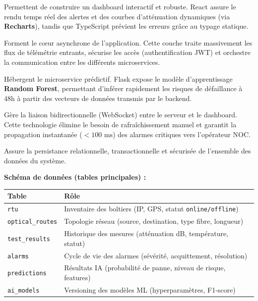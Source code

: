 \documentclass[11pt,a4paper]{article}
\begin{document}
\begin{description}[leftmargin=2.2cm, style=nextline]
    \item[\textcolor{teal-accent}{\textbf{React.js \& TypeScript (Frontend)}}]
    Permettent de construire un dashboard interactif et robuste. React assure le rendu temps réel des alertes et des courbes d'atténuation dynamiques (via \textbf{Recharts}), tandis que TypeScript prévient les erreurs grâce au typage statique.

    \item[\textcolor{teal-accent}{\textbf{Node.js \& Express (Backend)}}]
    Forment le cœur asynchrone de l'application. Cette couche traite massivement les flux de télémétrie entrants, sécurise les accès (authentification JWT) et orchestre la communication entre les différents microservices.

    \item[\textcolor{teal-accent}{\textbf{Python \& Flask (Service IA)}}]
    Hébergent le microservice prédictif. Flask expose le modèle d'apprentissage \textbf{Random Forest}, permettant d'inférer rapidement les risques de défaillance à 48h à partir des vecteurs de données transmis par le backend.

    \item[\textcolor{teal-accent}{\textbf{Socket.IO (Temps Réel)}}]
    Gère la liaison bidirectionnelle (WebSocket) entre le serveur et le dashboard. Cette technologie élimine le besoin de rafraîchissement manuel et garantit la propagation instantanée ($<100\text{ ms}$) des alarmes critiques vers l'opérateur NOC.

    \item[\textcolor{teal-accent}{\textbf{PostgreSQL (Base de Données)}}]
    Assure la persistance relationnelle, transactionnelle et sécurisée de l'ensemble des données du système.
\end{description}

\textbf{Schéma de données (tables principales) :}
\begin{center}
\small
\begin{tabular}{lp{8.5cm}}
    \toprule
    \textbf{Table} & \textbf{Rôle} \\
    \midrule
    \texttt{rtu}            & Inventaire des boîtiers (IP, GPS, statut \texttt{online/offline}) \\
    \texttt{optical\_routes} & Topologie réseau (source, destination, type fibre, longueur) \\
    \texttt{test\_results}  & Historique des mesures (atténuation dB, température, statut) \\
    \texttt{alarms}         & Cycle de vie des alarmes (sévérité, acquittement, résolution) \\
    \texttt{predictions}    & Résultats IA (probabilité de panne, niveau de risque, features) \\
    \texttt{ai\_models}     & Versioning des modèles ML (hyperparamètres, F1-score) \\
    \bottomrule
\end{tabular}
\end{center}
\end{document}
